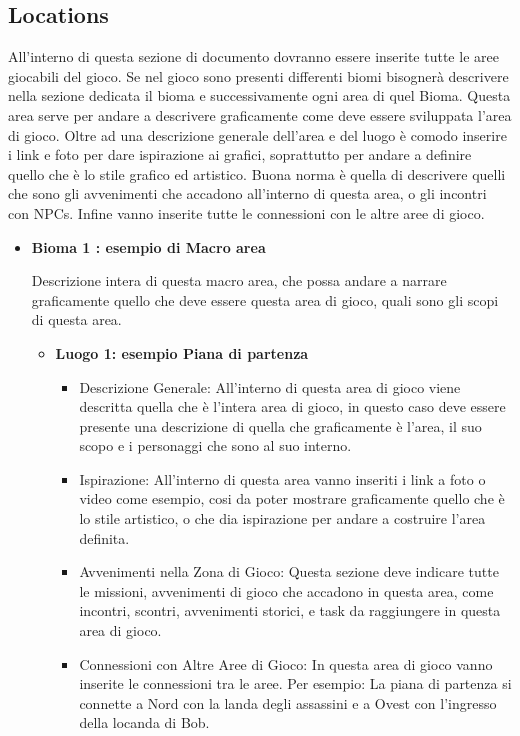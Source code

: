\documentclass{report}
\begin{document}
\subsection{Locations}
All'interno di questa sezione di documento dovranno essere inserite tutte le aree giocabili del gioco. Se nel gioco sono presenti differenti biomi bisognerà descrivere nella sezione dedicata il bioma e successivamente ogni area di quel Bioma. Questa area serve per andare a descrivere graficamente come deve essere sviluppata l'area di gioco. Oltre ad una descrizione generale dell'area e del luogo è comodo inserire i link e foto per dare ispirazione ai grafici, soprattutto per andare a definire quello che è lo stile grafico ed artistico.
Buona norma è quella di descrivere quelli che sono gli avvenimenti che accadono all'interno di questa area, o gli incontri con NPCs. Infine vanno inserite tutte le connessioni con le altre aree di gioco.

\begin{itemize}
\item \textbf{Bioma 1 : esempio di Macro area}

Descrizione intera di questa macro area, che possa andare a narrare graficamente quello che deve essere questa area di gioco, quali sono gli scopi di questa area.
    \begin{itemize}
    \item \textbf{Luogo 1: esempio Piana di partenza}    
        \begin{itemize}
            \item Descrizione Generale: All'interno di questa area di gioco viene descritta quella che è l'intera area di gioco, in questo caso deve essere presente una descrizione di quella che graficamente è l'area, il suo scopo e i personaggi che sono al suo interno.
            \item Ispirazione: All'interno di questa area vanno inseriti i link a foto o video come esempio, cosi da poter mostrare graficamente quello che è lo stile artistico, o che dia ispirazione per andare a costruire l'area definita.
            \item Avvenimenti nella Zona di Gioco: Questa sezione deve indicare tutte le missioni, avvenimenti di gioco che accadono in questa area, come incontri, scontri, avvenimenti storici, e task da raggiungere in questa area di gioco.
            \item Connessioni con Altre Aree di Gioco: In questa area di gioco vanno inserite le connessioni tra le aree. Per esempio: La piana di partenza si connette a Nord con la landa degli assassini e a Ovest con l'ingresso della locanda di Bob.
        \end{itemize}
    \end{itemize}
\end{itemize}
\end{document}
